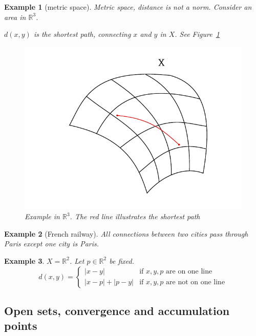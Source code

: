 \documentclass{article}
\newtheorem{example}{Example}  \numberwithin{example}{section}
\newcommand{\card}[1]{\left|#1\right|}
\begin{document}
\begin{example}[metric space]
  Metric space, distance is not a norm.
  Consider an area in $\mathbb R^3$.

  $d(x,y)$ is the shortest path, connecting $x$ and $y$ in $X$.
  See Figure~\ref{img:example-r3}

  \begin{figure}
    \begin{center}
      \includegraphics{img/01_example.pdf}
      \caption{Example in $\mathbb R^3$. The red line illustrates the shortest path}
      \label{img:example-r3}
    \end{center}
  \end{figure}
\end{example}

\begin{example}[French railway]
  All connections between two cities pass through Paris except one city is Paris.
\end{example}

\begin{example}
  $X = \mathbb R^2$. Let $p \in \mathbb R^2$ be fixed.
  \[
    d(x, y) = \begin{cases}
      \card{x - y}                & \text{if } x, y, p \text{ are on one line} \\
      \card{x - p} + \card{p - y} & \text{if } x, y, p \text{ are not on one line}
    \end{cases}
  \]
\end{example}

\subsection{Open sets, convergence and accumulation points}
\end{document}
